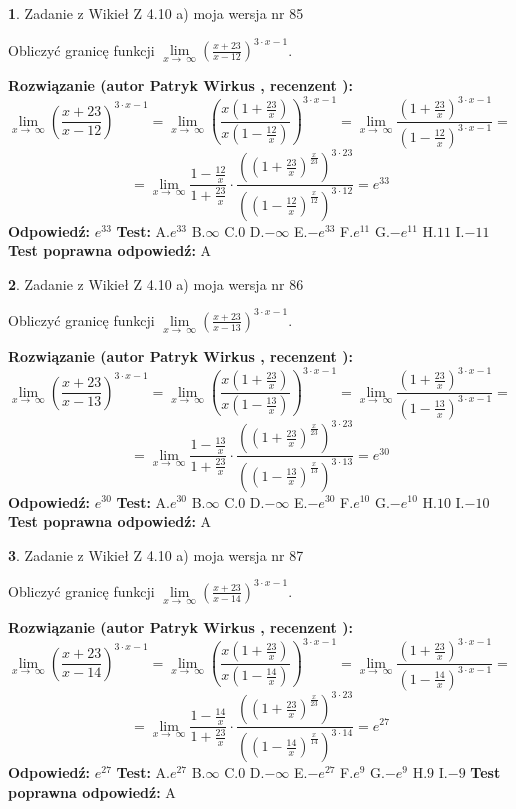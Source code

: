 \documentclass[12pt, a4paper]{article}
\theoremstyle{definition} %
\newtheorem{zad}{}
\newcommand{\zadStart}[1]{\begin{zad}#1\newline}
\newcommand{\zadStop}{\end{zad}}
\newcommand{\rozwStart}[2]{\noindent \textbf{Rozwiązanie (autor #1 , recenzent #2): }\newline}
\newcommand{\rozwStop}{\newline}
\newcommand{\odpStart}{\noindent \textbf{Odpowiedź:}\newline}
\newcommand{\odpStop}{\newline}
\newcommand{\testStart}{\noindent \textbf{Test:}\newline}
\newcommand{\testStop}{\newline}
\newcommand{\kluczStart}{\noindent \textbf{Test poprawna odpowiedź:}\newline}
\newcommand{\kluczStop}{\newline}
\begin{document}
\zadStart{Zadanie z Wikieł Z 4.10 a) moja wersja nr 85}

Obliczyć granicę funkcji  $\lim\limits_{x\to\ \infty}(\frac{x+23}{x-12})^{3\cdot x-1}$.
\zadStop
\rozwStart{Patryk Wirkus}{}
$$\lim\limits_{x\to\ \infty}(\frac{x+23}{x-12})^{3\cdot x-1} = \lim\limits_{x\to\ \infty}(\frac{x(1+\frac{23}{x})}{x(1-\frac{12}{x})})^{3\cdot x-1}=\lim\limits_{x\to\ \infty}\frac{(1+\frac{23}{x})^{3\cdot x-1}}{(1-\frac{12}{x})^{3\cdot x-1}}=$$
$$=\lim\limits_{x\to\ \infty}\frac{1-\frac{12}{x}}{1+\frac{23}{x}}\cdot\frac{((1+\frac{23}{x})^{\frac{x}{23}})^{3\cdot23}}{((1-\frac{12}{x})^{\frac{x}{12}})^{3\cdot12}}=e^{33}$$
\rozwStop
\odpStart
$e^{33}$
\odpStop
\testStart
A.$e^{33}$ B.$\infty$ C.$0$ D.$-\infty$ E.$-e^{33}$
F.$e^{11}$ G.$-e^{11}$
H.$11$
I.$-11$
\testStop
\kluczStart
A
\kluczStop



\zadStart{Zadanie z Wikieł Z 4.10 a) moja wersja nr 86}

Obliczyć granicę funkcji  $\lim\limits_{x\to\ \infty}(\frac{x+23}{x-13})^{3\cdot x-1}$.
\zadStop
\rozwStart{Patryk Wirkus}{}
$$\lim\limits_{x\to\ \infty}(\frac{x+23}{x-13})^{3\cdot x-1} = \lim\limits_{x\to\ \infty}(\frac{x(1+\frac{23}{x})}{x(1-\frac{13}{x})})^{3\cdot x-1}=\lim\limits_{x\to\ \infty}\frac{(1+\frac{23}{x})^{3\cdot x-1}}{(1-\frac{13}{x})^{3\cdot x-1}}=$$
$$=\lim\limits_{x\to\ \infty}\frac{1-\frac{13}{x}}{1+\frac{23}{x}}\cdot\frac{((1+\frac{23}{x})^{\frac{x}{23}})^{3\cdot23}}{((1-\frac{13}{x})^{\frac{x}{13}})^{3\cdot13}}=e^{30}$$
\rozwStop
\odpStart
$e^{30}$
\odpStop
\testStart
A.$e^{30}$ B.$\infty$ C.$0$ D.$-\infty$ E.$-e^{30}$
F.$e^{10}$ G.$-e^{10}$
H.$10$
I.$-10$
\testStop
\kluczStart
A
\kluczStop



\zadStart{Zadanie z Wikieł Z 4.10 a) moja wersja nr 87}

Obliczyć granicę funkcji  $\lim\limits_{x\to\ \infty}(\frac{x+23}{x-14})^{3\cdot x-1}$.
\zadStop
\rozwStart{Patryk Wirkus}{}
$$\lim\limits_{x\to\ \infty}(\frac{x+23}{x-14})^{3\cdot x-1} = \lim\limits_{x\to\ \infty}(\frac{x(1+\frac{23}{x})}{x(1-\frac{14}{x})})^{3\cdot x-1}=\lim\limits_{x\to\ \infty}\frac{(1+\frac{23}{x})^{3\cdot x-1}}{(1-\frac{14}{x})^{3\cdot x-1}}=$$
$$=\lim\limits_{x\to\ \infty}\frac{1-\frac{14}{x}}{1+\frac{23}{x}}\cdot\frac{((1+\frac{23}{x})^{\frac{x}{23}})^{3\cdot23}}{((1-\frac{14}{x})^{\frac{x}{14}})^{3\cdot14}}=e^{27}$$
\rozwStop
\odpStart
$e^{27}$
\odpStop
\testStart
A.$e^{27}$ B.$\infty$ C.$0$ D.$-\infty$ E.$-e^{27}$
F.$e^{9}$ G.$-e^{9}$
H.$9$
I.$-9$
\testStop
\kluczStart
A
\kluczStop
\end{document}
